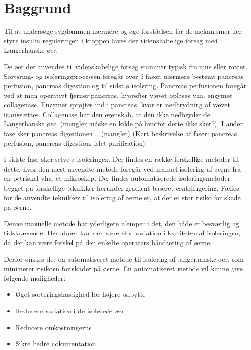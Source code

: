 \section{Baggrund}
Til at undersøge sygdommen nærmere og øge forståelsen for de mekanismer der styre insulin reguleringen i kroppen laves der videnskabelige forsøg med Langerhanske øer.

De øer der anvendes til videnskabelige forsøg stammer typisk fra mus eller rotter. Sortering- og isoleringsprocessen foregår over 3 faser, nærmere bestemt pancreas perfusion, pancreas digestion og til sidst ø isolering. Pancreas perfusionen foregår ved at man operativt fjerner pancreas, hvorefter vævet opløses vha. enzymet collagenase. Enzymet sprøjtes ind i pancreas, hvor en nedbrydning af vævet igangsættes. Collagenase har den egenskab, at den ikke nedbryder de Langerhanske øer. (mangler måske en kilde på hvorfor dette ikke sker?). I anden fase sker pancreas digestionen .. (mangler)  (Kort beskrivelse af faser: pancreas perfusion, pancreas digestion, islet purification).

I sidste fase sker selve ø isoleringen. Der findes en række forskellige metoder til dette, hvor den mest anvendte metode foregår ved manuel isolering af øerne fra en petriskål vha. et mikroskop. Der findes automatiserede isoleringsmetoder bygget på forskellige teknikker herunder gradient baseret centrifugering. Fælles for de anvendte teknikker til  isolering af øerne er, at der er stor risiko for skade på øerne.

Denne manuelle metode har yderligere ulemper i det, den både er besværlig og tidskrævende. Herudover kan der være stor variation i kvaliteten af isoleringen, da der kan være forskel på den enkelte operatørs håndtering af øerne. 

Derfor ønskes der en automatiseret metode til isolering af langerhanske øer, som minimerer risikoen for skader på øerne. En automatiseret metode vil kunne give følgende muligheder: 

\begin{itemize}
\item Øget sorteringshastighed for højere udbytte
\item Reducere variation i de isolerede øer
\item Reducere omkostningerne
\item Sikre bedre dokumentation
\end{itemize} 

